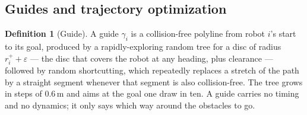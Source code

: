 \documentclass[conference]{IEEEtran}
\theoremstyle{plain}
\theoremstyle{definition}
\newtheorem{definition}{Definition}
\newcommand{\clr}{\varepsilon}
\begin{document}
\subsection{Guides and trajectory optimization}
\label{sec:prelim-opt}

\begin{definition}[Guide]
\label{def:guide}
A guide $\gamma_i$ is a collision-free polyline from robot $i$'s start to its goal, produced
by a rapidly-exploring random tree \cite{lavalle2001} for a disc of radius $r^{+}_i + \clr$
--- the disc that covers the robot at any heading, plus clearance --- followed by random
shortcutting, which repeatedly replaces a stretch of the path by a straight segment whenever
that segment is also collision-free. The tree grows in steps of $0.6$\,m and aims at the goal
one draw in ten. A guide carries no timing and no dynamics; it only says which way around the
obstacles to go.
\end{definition}
\end{document}
